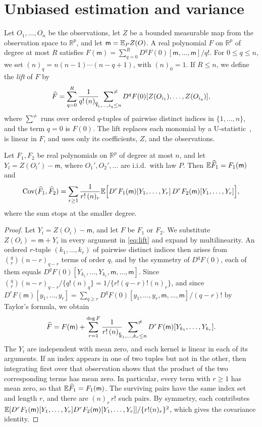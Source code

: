 \section{Unbiased estimation and variance}\label{sec:unbiased}

Let $O_1,\ldots,O_n$ be the observations, let $Z$ be a bounded measurable
map from the observation space to $\mathbb R^p$, and let
$\mathsf m=\mathbb E_PZ(O)$. A real polynomial $F$ on $\mathbb R^p$ of degree at
most $R$ satisfies
$F(\mathsf m)=\sum_{q=0}^R D^qF(0)[\mathsf m,\ldots,\mathsf m]/q!$. For
$0\le q\le n$, we set $(n)_q=n(n-1)\cdots(n-q+1)$, with $(n)_0=1$. If
$R\le n$, we define the \emph{lift} of $F$ by
\begin{equation}\label{eq:lift}
 \widehat F=\sum_{q=0}^R\frac1{q!\,(n)_q}
   \sideset{}{^{\neq}}\sum_{i_1,\ldots,i_q\le n}
   D^qF(0)[Z(O_{i_1}),\ldots,Z(O_{i_q})],
\end{equation}
where $\sum^{\neq}$ runs over ordered $q$-tuples of pairwise distinct
indices in $\{1,\ldots,n\}$, and the term $q=0$ is $F(0)$. The lift
replaces each monomial by a U-statistic~\cite{halmos,hoeffding}, is
linear in $F$, and uses only its coefficients, $Z$, and the observations.

\begin{lemma}\label{lem:lift}
Let $F_1,F_2$ be real polynomials on $\mathbb R^p$ of degree at most $n$,
and let $Y_l=Z(O_l')-\mathsf m$, where $O_1',O_2',\ldots$ are i.i.d.\ with
law $P$. Then $\mathbb E\widehat F_1=F_1(\mathsf m)$ and
\[
 \operatorname{Cov}(\widehat F_1,\widehat F_2)=\sum_{r\ge1}\frac1{r!\,(n)_r}
 \mathbb E\Bigl[D^rF_1(\mathsf m)[Y_1,\ldots,Y_r]\,
         D^rF_2(\mathsf m)[Y_1,\ldots,Y_r]\Bigr],
\]
where the sum stops at the smaller degree.
\end{lemma}
\begin{proof}
Let $Y_i=Z(O_i)-\mathsf m$, and let $F$ be $F_1$ or $F_2$. We substitute
$Z(O_i)=\mathsf m+Y_i$ in every argument in \eqref{eq:lift} and expand by
multilinearity. An ordered $r$-tuple $(k_1,\ldots,k_r)$ of pairwise
distinct indices then arises from $\binom qr(n-r)_{q-r}$ terms of order
$q$, and by the symmetry of $D^qF(0)$, each of them equals
$D^qF(0)[Y_{k_1},\ldots,Y_{k_r},\mathsf m,\ldots,\mathsf m]$. Since
$\binom qr(n-r)_{q-r}/\{q!(n)_q\}=1/\{r!(q-r)!(n)_r\}$, and since
$D^rF(\mathsf m)[y_1,\ldots,y_r]=\sum_{q\ge r}D^qF(0)[y_1,\ldots,y_r,\mathsf m,\ldots,\mathsf m]/(q-r)!$
by Taylor's formula, we obtain
\[
 \widehat F=F(\mathsf m)+\sum_{r=1}^{\deg F}\frac1{r!\,(n)_r}
 \sideset{}{^{\neq}}\sum_{k_1,\ldots,k_r\le n}
 D^rF(\mathsf m)[Y_{k_1},\ldots,Y_{k_r}].
\]
The $Y_i$ are independent with mean zero, and each kernel is linear in
each of its arguments. If an index appears in one of two tuples but not
in the other, then integrating first over that observation shows that the
product of the two corresponding terms has mean zero. In particular, every
term with $r\ge1$ has mean zero, so that $\mathbb E\widehat F_1=F_1(\mathsf m)$.
The surviving pairs have the same index set and length $r$, and there
are $(n)_r\,r!$ such pairs. By symmetry, each contributes
$\mathbb E[D^rF_1(\mathsf m)[Y_1,\ldots,Y_r]D^rF_2(\mathsf m)[Y_1,\ldots,Y_r]]/\{r!(n)_r\}^2$,
which gives the covariance identity.
\end{proof}

